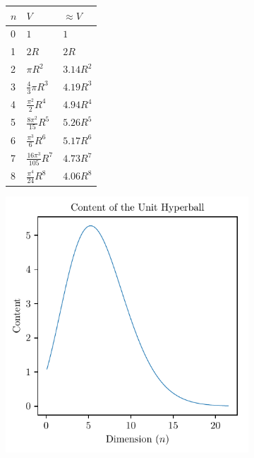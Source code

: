 \documentclass[preview]{standalone}
\begin{document}
	\begin{figure}
		\centering
		\begin{subfigure}{.5\textwidth}
			\centering
			\begin{tabular}{lll}
				\toprule
				$n$ & $V$ & $\approx V$ \\
				\midrule
				0 	& $1$ 						& $1$ \\
				1	& $2R$ 						& $2R$ \\
				2	& $\pi{}R^2$				& $3.14R^2$ \\
				3 	& $\frac{4}{3}\pi{}R^3$		& $4.19R^3$ \\
				4	& $\frac{\pi^2}{2}R^4$		& $4.94R^4$ \\
				5	& $\frac{8\pi^2}{15}R^5$	& $5.26R^5$ \\
				6 	& $\frac{\pi^3}{6}R^6$		& $5.17R^6$ \\
				7 	& $\frac{16\pi^3}{105}R^7$ 	& $4.73R^7$ \\
				8	& $\frac{\pi^4}{24}R^8$		&$4.06R^8$ \\
				\bottomrule
			\end{tabular}
		\end{subfigure}%
		\begin{subfigure}{.5\textwidth}
			\centering
			\includegraphics[width=\linewidth]{n-ball-graph-right.pdf}
		\end{subfigure}
	\end{figure}
\end{document}
